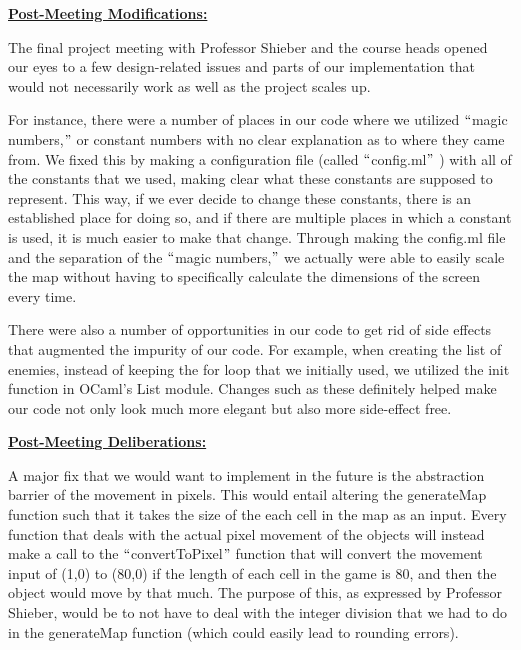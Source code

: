 \documentclass[12pt]{article}
\begin{document}
\vspace{\baselineskip}
\textbf{\uline{Post-Meeting Modifications:}}\par

The final project meeting with Professor Shieber and the course heads opened our eyes to a few design-related issues and parts of our implementation that would not necessarily work as well as the project scales up.\par


\vspace{\baselineskip}
For instance, there were a number of places in our code where we utilized $``$magic numbers,$"$  or constant numbers with no clear explanation as to where they came from. We fixed this by making a configuration file (called $``$config.ml$"$ ) with all of the constants that we used, making clear what these constants are supposed to represent. This way, if we ever decide to change these constants, there is an established place for doing so, and if there are multiple places in which a constant is used, it is much easier to make that change. Through making the config.ml file and the separation of the $``$magic numbers,$"$  we actually were able to easily scale the map without having to specifically calculate the dimensions of the screen every time. \par


\vspace{\baselineskip}
There were also a number of opportunities in our code to get rid of side effects that augmented the impurity of our code. For example, when creating the list of enemies, instead of keeping the for loop that we initially used, we utilized the init function in OCaml’s List module. Changes such as these definitely helped make our code not only look much more elegant but also more side-effect free.\par


\vspace{\baselineskip}
\textbf{\uline{Post-Meeting Deliberations:}}\par

A major fix that we would want to implement in the future is the abstraction barrier of the movement in pixels. This would entail altering the generateMap function such that it takes the size of the each cell in the map as an input. Every function that deals with the actual pixel movement of the objects will instead make a call to the $``$convertToPixel$"$  function that will convert the movement input of (1,0) to (80,0) if the length of each cell in the game is 80, and then the object would move by that much. The purpose of this, as expressed by Professor Shieber, would be to not have to deal with the integer division that we had to do in the generateMap function (which could easily lead to rounding errors).\par
\end{document}

